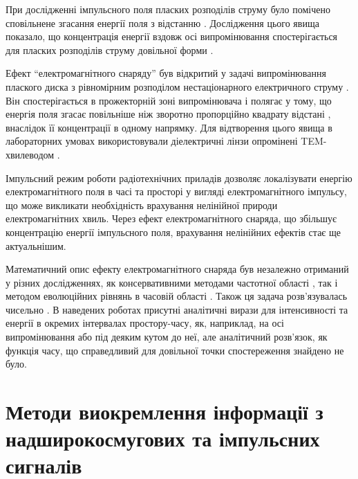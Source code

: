 При дослідженні імпульсного поля пласких розподілів струму було 
помічено сповільнене згасання енергії поля з відстанню \cite{imp:Wu1989}. 
Дослідження цього явища показало, що концентрація енергії вздовж осі 
випромінювання спостерігається для пласких розподілів струму довільної форми 
\cite{imp:Wu1985}.

Ефект ``електромагнітного снаряду'' був відкритий у задачі випромінювання 
плаского диска з рівномірним розподілом нестаціонарного електричного струму 
\cite{imp:Wu1985}. Він спостерігається в прожекторній зоні випромінювача і 
полягає у тому, що енергія поля згасає повільніше ніж зворотно пропорційно 
квадрату відстані \cite{imp:Sodin1992-10}, внаслідок її концентрації в 
одному напрямку. Для відтворення цього явища в лабораторних умовах 
використовували діелектричні лінзи опромінені TEM-хвилеводом 
\cite{imp:Wu1991}.

Імпульсний режим роботи радіотехнічних приладів дозволяє локалізувати енергію 
електромагнітного поля в часі та просторі у вигляді електромагнітного 
імпульсу, що може викликати необхідність врахування нелінійної природи 
електромагнітних хвиль. Через ефект електромагнітного снаряда, що збільшує 
концентрацію енергії імпульсного поля, врахування нелінійних ефектів стає 
ще актуальнішим.

Математичний опис ефекту електромагнітного снаряда був незалежно отриманий 
у різних дослідженнях, як консервативними методами частотної області
\cite{imp:Wu1987, imp:Samsonov1986}, так і методом еволюційних рівнянь в 
часовій області \cite{imp:Dumin1996}. Також ця задача розв'язувалась 
чисельно \cite{imp:Butrim2004}. В наведених роботах присутні
аналітичні вирази для інтенсивності та енергії в окремих інтервалах 
простору-часу, як, наприклад, на осі випромінювання або під деяким кутом до 
неї, але аналітичний розв'язок, як функція часу, що справедливий для 
довільної точки спостереження знайдено не було.

\section{Методи виокремлення інформації з надширокосмугових та імпульсних сигналів}

